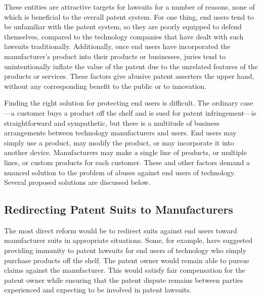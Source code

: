 \documentclass[11pt,twocolumn,titlepage]{article}
\begin{document}
These entities are attractive targets for lawsuits for a number of reasons, none
of which is beneficial to the overall patent system. For one thing, end users
tend to be unfamiliar with the patent system, so they are poorly equipped to
defend themselves, compared to the technology companies that have dealt with
such lawsuits traditionally. Additionally, once end users have
incorporated the manufacturer's product into their products or businesses,
juries tend to unintentionally inflate the value of the patent due to the
unrelated features of the products or services.
These factors give abusive patent asserters the upper hand, without any
corresponding benefit to the public or to innovation.

Finding the right solution for protecting end users is difficult. The ordinary
case---a customer buys a product off the shelf and is sued for patent
infringement---is straightforward and sympathetic, but there is a multitude of
business arrangements between technology manufacturers and users. End users may
simply use a product, may modify the product, or may incorporate it into another
device. Manufacturers may make a single line of products, or multiple lines, or
custom products for each customer. These and other factors demand a nuanced
solution to the problem of abuses against end users of technology. Several
proposed solutions are discussed below.

\subsection{Redirecting Patent Suits to Manufacturers}
\SectionNote

The most direct reform would be to redirect suits against end users toward
manufacturer suits in appropriate situations. Some, for example, have suggested
providing immunity to patent lawsuits for end users of technology who simply
purchase products off the shelf. The patent owner would remain able to pursue claims against the
manufacturer. This would satisfy fair compensation
for the patent owner while ensuring that the patent dispute remains between
parties experienced and expecting to be involved in patent lawsuits.
\end{document}
